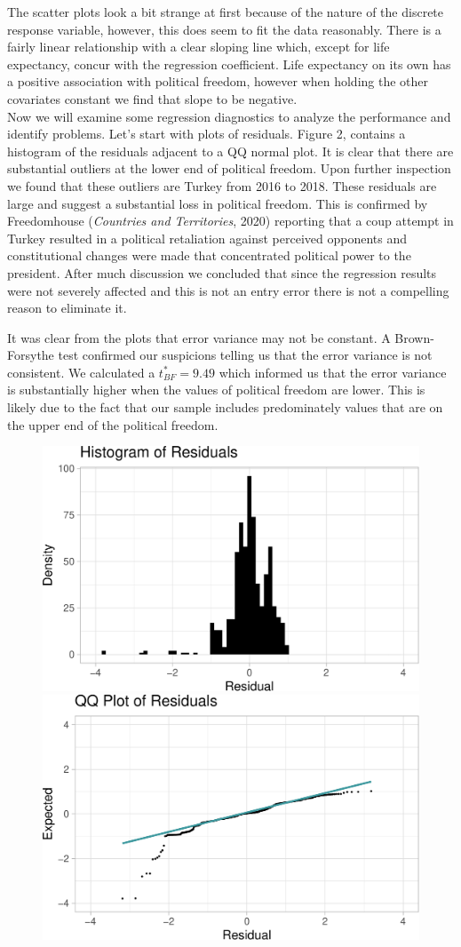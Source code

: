 \documentclass[
  english,
  man,floatsintext]{apa6}
\begin{document}
The scatter plots look a bit strange at first because of the nature of the discrete response variable, however, this does seem to fit the data reasonably. There is a fairly linear relationship with a clear sloping line which, except for life expectancy, concur with the regression coefficient. Life expectancy on its own has a positive association with political freedom, however when holding the other covariates constant we find that slope to be negative.\\
Now we will examine some regression diagnostics to analyze the performance and identify problems. Let's start with plots of residuals. Figure 2, contains a histogram of the residuals adjacent to a QQ normal plot. It is clear that there are substantial outliers at the lower end of political freedom. Upon further inspection we found that these outliers are Turkey from 2016 to 2018. These residuals are large and suggest a substantial loss in political freedom. This is confirmed by Freedomhouse (\emph{Countries and Territories}, 2020) reporting that a coup attempt in Turkey resulted in a political retaliation against perceived opponents and constitutional changes were made that concentrated political power to the president. After much discussion we concluded that since the regression results were not severely affected and this is not an entry error there is not a compelling reason to eliminate it.

It was clear from the plots that error variance may not be constant. A Brown-Forsythe test confirmed our suspicions telling us that the error variance is not consistent. We calculated a \(t^{*}_{BF} = 9.49\) which informed us that the error variance is substantially higher when the values of political freedom are lower. This is likely due to the fact that our sample includes predominately values that are on the upper end of the political freedom.

\begin{figure}
\includegraphics[width=0.5\linewidth]{paper_files/figure-latex/unnamed-chunk-6-1} \includegraphics[width=0.5\linewidth]{paper_files/figure-latex/unnamed-chunk-6-2} \caption{ }\label{fig:unnamed-chunk-6}
\end{figure}
\end{document}
